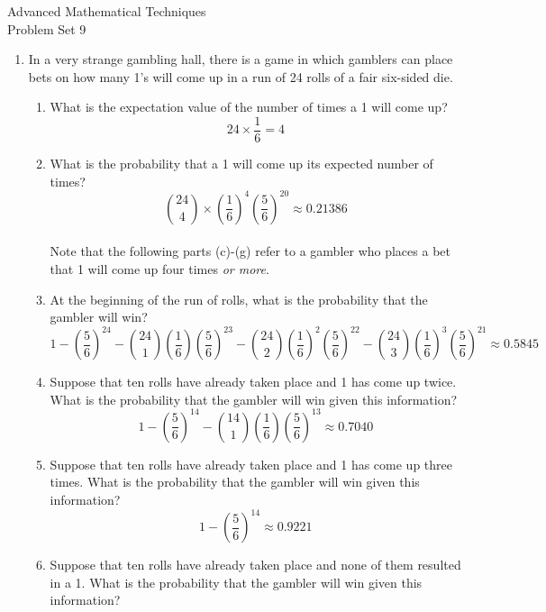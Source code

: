\documentclass{article}
\begin{document}
\thispagestyle{fancy}
\begin{center}\LARGE{Advanced Mathematical Techniques \\ Problem Set 9}\end{center}
\vspace{10mm}
\begin{enumerate}
    \item In a very strange gambling hall, there is a game in which gamblers can place bets on how many 1's will come up in a run of 24 rolls of a fair six-sided die.
    \begin{enumerate}
        \item What is the expectation value of the number of times a 1 will come up?
        \\
        \[24 \times \frac 1 6 = \boxed 4\]
        \item What is the probability that a 1 will come up its expected number of times?
        \\
        \[\binom {24}{4} \times \left(\frac 1 6\right)^4 \left( \frac 5 6 \right)^{20} \approx \boxed{0.21386}\]
        \\Note that the following parts (c)-(g) refer to a gambler who places a bet that 1 will come up four times \textit{or more}. 
        \item At the beginning of the run of rolls, what is the probability that the gambler will win? 
        \\
        \[1 - \left( \frac 5 6\right)^{24} - \binom{24}{1}\left(\frac 1 6\right) \left(\frac 5 6\right)^{23} - \binom{24}{2}\left(\frac 1 6\right)^2 \left(\frac 5 6\right)^{22} - \binom{24}{3}\left(\frac 1 6\right)^3 \left(\frac 5 6\right)^{21} \approx \boxed{0.5845}\]
        \item Suppose that ten rolls have already taken place and 1 has come up twice. What is the probability that the gambler will win given this information?
        \\
        \[1 - \left( \frac 5 6\right)^{14} - \binom{14}{1}\left(\frac 1 6\right) \left(\frac 5 6\right)^{13}  \approx \boxed{0.7040}\]
        \item Suppose that ten rolls have already taken place and 1 has come up three times. What is the probability that the gambler will win given this information?
        \\
        \[1 - \left( \frac 5 6\right)^{14} \approx \boxed{0.9221}\]
        \item Suppose that ten rolls have already taken place and none of them resulted in a 1. What is the probability that the gambler will win given this information?

\end{enumerate}
\end{enumerate}
\end{document}
